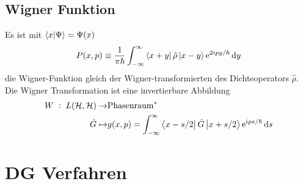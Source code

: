 \section{Wigner Funktion}
\label{sec:wignerfunktion}
Es ist mit $\bra{x}\ket{\Psi} = \Psi(x)$
\begin{equation}
  P(x,p) \equiv \frac{1}{\pi\hbar} \int_{-\infty}^{\infty} \bra{x+y}\hat{\rho} \ket{x-y} \text{e}^{2ipy/\hbar} \mathop{}\!\mathrm{d} y
\end{equation}
die Wigner-Funktion gleich der Wigner-transformierten des Dichteoperators $\hat{\rho}$. Die Wigner Transformation ist eine invertierbare Abbildung
\begin{align}
  W\; :\; L(\mathcal{H},\mathcal{H})  \rightarrow & \text{Phasenraum}^* \\
   \hat{G} \mapsto & g(x,p) = \int_{-\infty}^{\infty} \bra{x-s/2}\hat{G} \ket{x+s/2} \text{e}^{ips/\hbar} \mathop{}\!\mathrm{d} s
\end{align}

\chapter{DG Verfahren}
